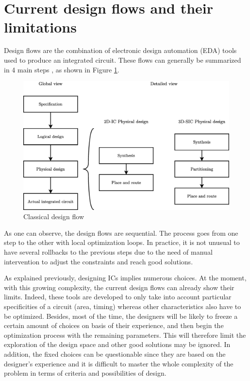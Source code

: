 \section{Current design flows and their limitations}
\label{sec:currentflows}

Design flows are the combination of electronic design automation (EDA) tools used to produce an integrated circuit. These flows can generally be summarized in 4 main steps \cite{coursefred}, as shown in Figure \ref{fig:designflow}.

\begin{figure}[h!]
\begin{center}
\includegraphics[width=\linewidth]{designflow2.eps}
\end{center}
\vspace{-0.5cm}
\caption{Classical design flow}
\label{fig:designflow}
\end{figure}

As one can observe, the design flows are sequential. The process goes from one step to the other with local optimization loops. In practice, it is not unusual to have several rollbacks to the previous steps due to the need of manual intervention to adjust the constraints and reach good solutions. %

As explained previously, designing ICs implies numerous choices. At the moment, with this growing complexity, the current design flows can already show their limits. Indeed, these tools are developed to only take into account particular specificities of a circuit (area, timing) whereas other characteristics also have to be optimized. Besides, most of the time, the designers will be likely to freeze a certain amount of choices on basis of their experience, and then begin the optimization process with the remaining parameters. This will therefore limit the exploration of the design space and other good solutions may be ignored. In addition, the fixed choices can be questionable since they are based on the designer's experience and it is difficult to master the whole complexity of the problem in terms of criteria and possibilities of design.

